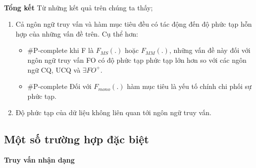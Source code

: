 \documentclass[12pt]{report}
\begin{document}
	 \\
\textbf{Tổng kết} Từ những kết quả trên chúng ta thấy;
	\begin{enumerate}
		\item Cả ngôn ngữ truy vấn và hàm mục tiêu đều có tác động đến độ phức 			tạp hỗn hợp của những vấn đề trên. Cụ thể hơn: 
			\begin{itemize}
  			\item \#P-complete khi F là $F_{MS} (.)$ hoặc $F_{MM} (.)$, những vấn đề này đối với ngôn ngữ truy vấn FO có độ phức tạp phức tạp lớn hơn so với các ngôn ngữ CQ, UCQ và $\exists FO^+$.
  			\item \#P-complete  Đối với $F_{mono} (.)$ hàm mục tiêu là yếu tố chính chi phối sự phức tạp.
  			\end{itemize} 
		\item Độ phức tạp của dữ liệu không liên quan tới ngôn ngữ truy vấn.
	\end{enumerate}
\subsection{Một số trường hợp đặc biệt}
\textbf{Truy vấn nhận dạng}
\end{document}
